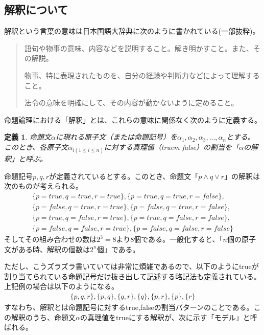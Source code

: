 \documentclass[dvipdfmx]{jsarticle}
\newtheorem{dfn}{定義}
\begin{document}
\subsection{解釈について}
解釈という言葉の意味は日本国語大辞典に次のように書かれている(一部抜粋)。
\begin{quote}
  語句や物事の意味、内容などを説明すること。解き明かすこと。また、その解説。\par
  物事、特に表現されたものを、自分の経験や判断力などによって理解すること。\par
  法令の意味を明確にして、その内容が動かないように定めること。
\end{quote}
命題論理における「解釈」とは、これらの意味に関係なく次のように定義する。
\begin{dfn}
  命題文$\alpha$に現れる原子文（または命題記号）を$\alpha_{1},\alpha_{2},\alpha_{3},...,\alpha_{n}$とする。このとき、各原子文$\alpha_{i(1 \leq i \leq n)}$に対する真理値（truem false）の割当を「$\alpha$の解釈」と呼ぶ。
\end{dfn}
命題記号$p, q, r$が定義されているとする。このとき、命題文「$p \wedge q \vee r$」の解釈は次のものが考えられる。
\begin{align*}
  \{p=true, q=true, r=true\}, \{p=true, q=true, r=false\}, \\
  \{p=false, q=true, r=true\}, \{p=false, q=true, r=false\},\\
   \{p=true, q=false, r=true\}, \{p=true, q=false, r=false\},\\
    \{p=false, q=false, r=true\}, \{p=false, q=false, r=false\}
\end{align*}
そしてその組み合わせの数は$2^{3} = 8$より8個である。一般化すると、「$n$個の原子文がある時、解釈の個数は$2^{n}個$」である。\par
ただし、こうズラズラ書いていては非常に煩雑であるので、以下のようにtrueが割り当てられている命題記号だけ抜き出して記述する略記法も定義されている。上記例の場合は以下のようになる。
\begin{align*}
  \{p, q, r\}, \{p, q\}, \{q,r\}, \{q\},\{p,r\},\{p\},\{r\}
\end{align*}
すなわち、解釈とは命題記号に対するtrue,falseの割当パターンのことである。この解釈のうち、命題文$\alpha$の真理値をtrueにする解釈が、次に示す「モデル」と呼ばれる。
\end{document}
